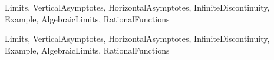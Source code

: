 \begin{tagblock}{Limits, VerticalAsymptotes, HorizontalAsymptotes, InfiniteDiscontinuity, Example, AlgebraicLimits, RationalFunctions}
\begin{question}
\begin{enumerate}
\end{enumerate}

	
	
\begin{tags}
Limits, VerticalAsymptotes, HorizontalAsymptotes, InfiniteDiscontinuity, Example, AlgebraicLimits, RationalFunctions

\end{tags}
	
\begin{diary}
	    
\end{diary}
	
\begin{solution}
	  
\end{solution}
	
\end{question}

\end{tagblock}



